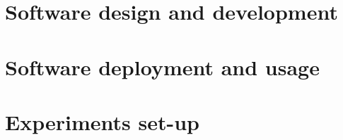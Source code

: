 
\section{Software design and development}
    

\section{Software deployment and usage}
    

\section{Experiments set-up}
    
